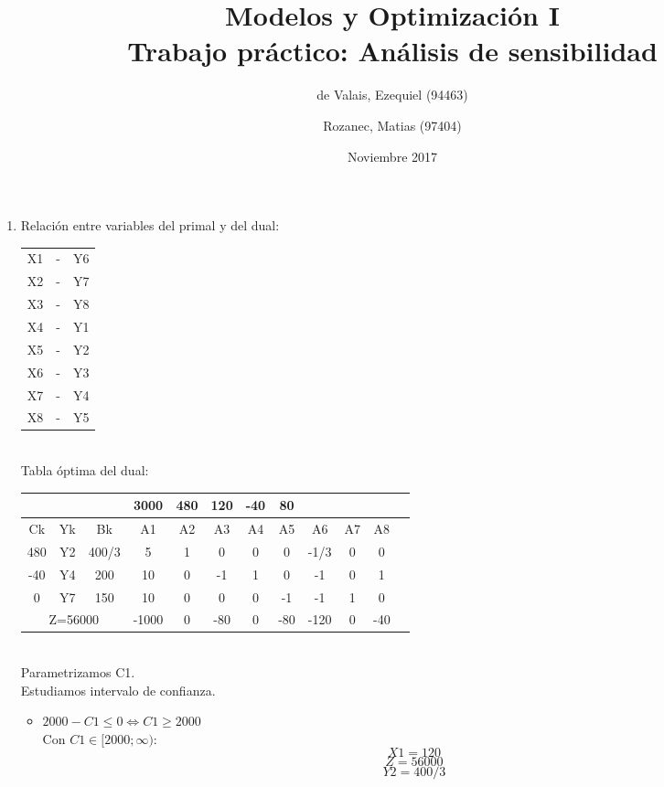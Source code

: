 \documentclass{article}
\begin{document}
\title{Modelos y Optimizaci\'on I\\ \large{Trabajo pr\'actico: An\'alisis de sensibilidad}}
\author{de Valais, Ezequiel (94463)\and	Rozanec, Matias (97404)}
\date{Noviembre 2017}
\maketitle
\newpage

\begin{enumerate}
	\item Relaci\'on entre variables del primal y del dual:\\
		\begin{tabular}{c c c}
			X1 & - & Y6 \\
			X2 & - & Y7 \\
			X3 & - & Y8 \\
			X4 & - & Y1 \\
			X5 & - & Y2 \\
			X6 & - & Y3 \\
			X7 & - & Y4 \\
			X8 & - & Y5 \\
		\end{tabular}
		\\
		Tabla \'optima del dual:\\
		\begin{tabular}{|c  c  c | c  c  c  c  c  c  c  c | c |}
			\hline
			 \multicolumn{3}{|c|}{} & 3000 & 480 & 120 & -40 & 80 & & &\\ \hline
			 Ck & Yk & Bk & A1 & A2 & A3 & A4 & A5 & A6 & A7 & A8\\ \hline 
			 480 & Y2 & 400/3 & 5 & 1 & 0 & 0 & 0 & -1/3 & 0 & 0\\
			 -40 & Y4 & 200 & 10 & 0 & -1 & 1 & 0 & -1 & 0 & 1\\
			 0 & Y7 & 150 & 10 & 0 & 0 & 0 & -1 & -1 & 1 & 0\\ \hline
			 \multicolumn{3}{|c|}{Z=56000} & -1000 & 0 & -80 & 0 & -80 & -120 & 0 & -40\\ \hline
		\end{tabular}
		\medskip\\
		Parametrizamos C1.\\
		Estudiamos intervalo de confianza.
		\begin{itemize}
				\item $2000 - C1 \leq 0 \iff C1 \geq 2000$\\
					Con $C1 \in [2000; \infty)$:\\
					$$X1 = 120$$
					$$Z = 56000$$
					$$Y2 = 400/3$$

\end{itemize}
\end{enumerate}
\end{document}
